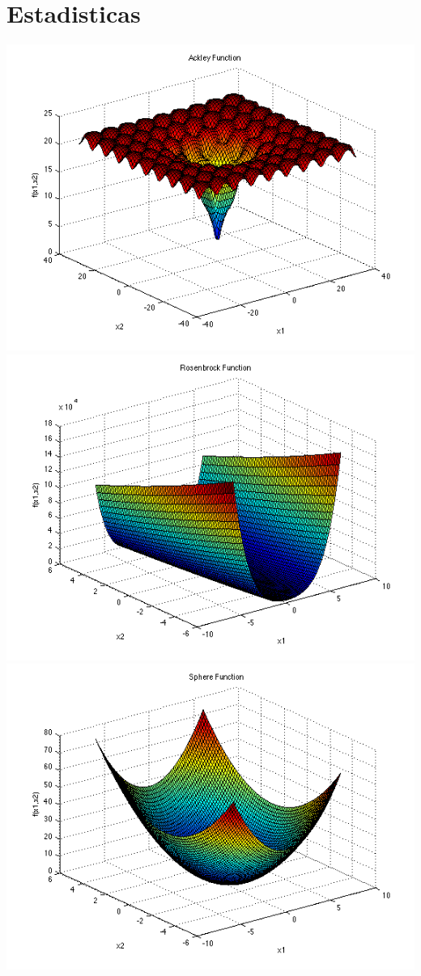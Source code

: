 \documentclass{article}
\begin{document}
\section{Estadisticas}
\includegraphics[scale=0.3]{ackley.png}
\includegraphics[scale=0.3]{rosen.png}
\includegraphics[scale=0.3]{sphere.png}
\end{document}
